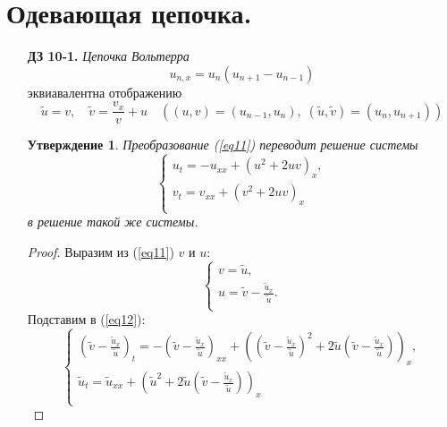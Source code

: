 \documentclass[12pt]{article}
\newtheorem{utv}{Утверждение}
\theoremstyle{definition}
\begin{document}
\section{Одевающая цепочка.}
\begin{itemize}
    \item[\textbf{ДЗ 10-1.}] \textit{Цепочка Вольтерра}
    \begin{equation}
        u_{n,x}=u_n(u_{n+1}-u_{n-1})
    \end{equation}
    эквиавалентна отображению
    \begin{equation}\label{eq11}
        \tilde u=v,\quad\tilde v=\frac{v_x}{v}+u\quad ((u,v)=(u_{n-1},u_n),\;(\tilde u,\tilde v)=(u_n,u_{n+1}))
    \end{equation}
    \begin{utv}
    Преобразование (\ref{eq11}) переводит решение системы
    \begin{equation}\label{eq12}
        \left\{
        \begin{array}{l}
        u_t=-u_{xx}+(u^2+2uv)_x,\\
        v_t=v_{xx}+(v^2+2uv)_x\\
        \end{array}
        \right.
    \end{equation}
    в решение такой же системы.
    \end{utv}
    \begin{proof}
        Выразим из (\ref{eq11}) $v$ и $u$:
        \begin{equation}
            \left\{
        \begin{array}{l}
        v=\tilde u,\\
        u=\tilde v-\frac{\tilde u_x}{\tilde u}.\\
        \end{array}
        \right.
        \end{equation}
        Подставим в (\ref{eq12}):
        \begin{equation}
            \left\{
        \begin{array}{l}
        (\tilde v-\frac{\tilde u_x}{\tilde u})_t=-(\tilde v-\frac{\tilde u_x}{\tilde u})_{xx}+((\tilde v-\frac{\tilde u_x}{\tilde u})^2+2\tilde u(\tilde v-\frac{\tilde u_x}{\tilde u}))_x,\\
        \tilde u_t=\tilde u_{xx}+(\tilde u^2+2\tilde u(\tilde v-\frac{\tilde u_x}{\tilde u}))_x\\
        \end{array}
        \right.
        \end{equation}

\end{proof}
\end{itemize}
\end{document}

